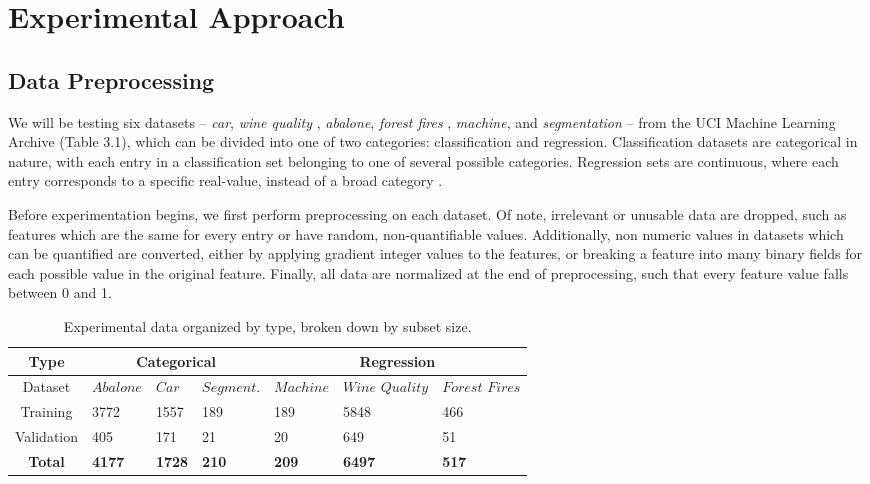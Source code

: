 \section{Experimental Approach}\label{sec:experimental-approach}

\subsection{Data Preprocessing}

We will be testing six datasets -- \textit{car}, \textit{wine quality} \citep{CCAMaR2009}, \textit{abalone}, \textit{forest fires} \citep{CaM2007}, \textit{machine}, and \textit{segmentation} -- from the UCI Machine Learning Archive (Table 3.1), which can be divided into one of two categories: classification and regression. Classification datasets are categorical in nature, with each entry in a classification set belonging to one of several possible categories. Regression sets are continuous, where each entry corresponds to a specific real-value, instead of a broad category \citep{Dua:2019}. 

Before experimentation begins, we first perform preprocessing on each dataset. Of note, irrelevant or unusable data are dropped, such as features which are the same for every entry or have random, non-quantifiable values. Additionally, non numeric values in datasets which can be quantified are converted, either by applying gradient integer values to the features, or breaking a feature into many binary fields for each possible value in the original feature. Finally, all data are normalized at the end of preprocessing, such that every feature value falls between 0 and 1.

\begin{table}[b!]
	\centering
	\begin{tabularx}{1\linewidth}{| c | X | X | X | X | X | X |}
		\hline
		Type 			& \multicolumn{3}{c|}{Categorical}	& \multicolumn{3}{c|}{Regression} 			\\ 
		\hline
		Dataset 		&$Abalone$    &$Car$ 		 &$Segment.$&$Machine$ &$Wine$ $Quality$& $Forest$ $Fires$\\ 
		\hline
		Training 		&3772		  &1557			 &189		  &189		   &5848		 &466		 \\ 
		\hline
		Validation		&405		  &171			 &21		  &20		   &649			 &51		  \\ 
		\hline
		\textbf{Total}	&\textbf{4177}& \textbf{1728}&\textbf{210}&\textbf{209}&\textbf{6497}&\textbf{517}\\ 
		\hline
	\end{tabularx}
	\caption{Experimental data organized by type, broken down by subset size.}
\end{table}

